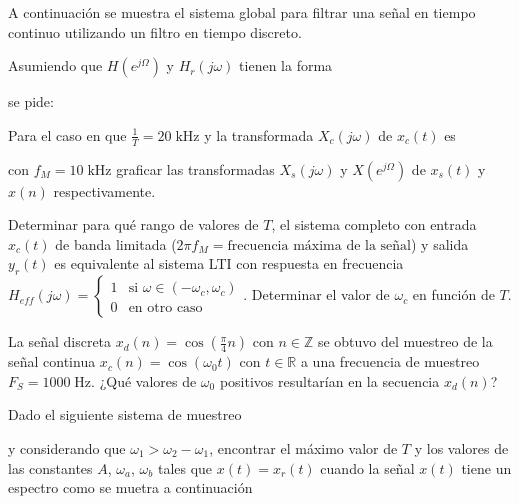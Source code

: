 

\begin{ejercicio}
    A continuación se muestra el sistema global para filtrar una señal en tiempo continuo utilizando un filtro en tiempo discreto.
    \begin{center}
        
    \end{center}
    Asumiendo que $H(e^{j\Omega})$ y $H_r(j\omega)$ tienen la forma
    \begin{center}
        
    \end{center}
    se pide:
    
    \inciso Para el caso en que $\frac{1}{T}=20\;\mathrm{kHz}$ y la transformada $X_c(j\omega)$ de $x_c(t)$ es
    \begin{center}
        
    \end{center}
    con $f_M=10\;\mathrm{kHz}$ graficar las transformadas $X_s(j\omega)$ y $X(e^{j\Omega})$ de $x_s(t)$ y $x(n)$ respectivamente.
    
    \inciso Determinar para qué rango de valores de $T$, el sistema completo con entrada $x_c(t)$ de banda limitada ($2\pi f_M=\mbox{frecuencia máxima de la señal}$) y salida $y_r(t)$ es equivalente al sistema LTI con respuesta en frecuencia $H_{eff}(j\omega)=\begin{cases}1 & \mbox{si $\omega \in (-\omega_c,\omega_c)$}\\ 0 & \mbox{en otro caso}\end{cases}$. Determinar el valor de $\omega_c$ en función de $T$.
    
    \end{ejercicio}
    
    
    \begin{ejercicio}
    La señal discreta $x_d(n)=\cos\left(\frac{\pi}{4}n\right)$ con $n\in\mathbb{Z}$ se obtuvo del muestreo de la señal continua $x_c(n)=\cos\left(\omega_0 t\right)$ con $t\in\mathbb{R}$ a una frecuencia de muestreo $F_S = 1000\;\mathrm{Hz}$. ¿Qué valores de $\omega_0$ positivos resultarían en la secuencia $x_d(n)$?
    \end{ejercicio}
    
    
    \begin{ejercicio}
    Dado el siguiente sistema de muestreo
    \begin{center}
    
    \end{center}
    y considerando que $\omega_1 > \omega_2-\omega_1$, encontrar el máximo valor de $T$ y los valores de las constantes $A$, $\omega_a$, $\omega_b$ tales que $x(t)=x_r(t)$ cuando la señal $x(t)$ tiene un espectro como se muetra a continuación
    \begin{center}
    
    \end{center}
    \end{ejercicio}
    
